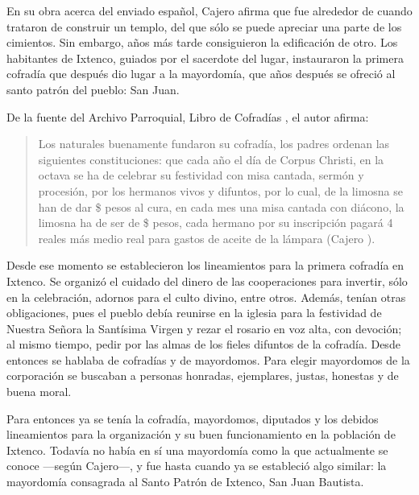\documentclass[14pt,letterpaper,twoside]{extbook} %
\begin{document}
\noindent En su obra acerca del enviado español, Cajero afirma que fue alrededor de  cuando trataron de construir un templo, del que sólo se puede apreciar una parte de los cimientos. Sin embargo, años más tarde consiguieron la edificación de otro. Los habitantes de Ixtenco, guiados por el sacerdote del lugar, instauraron la primera cofradía que después dio lugar a la mayordomía, que años después se ofreció al santo patrón del pueblo: San Juan.

De la fuente del Archivo Parroquial, Libro de Cofradías , el autor afirma:

\begin{quotation}
\noindent Los naturales buenamente fundaron su cofradía, los padres ordenan las siguientes constituciones: que cada año el día de Corpus Christi, en la octava se ha de celebrar su festividad con misa cantada, sermón y procesión, por los hermanos vivos y difuntos, por lo cual, de la limosna se han de dar \$ pesos al cura, en cada mes una misa cantada con diácono, la limosna ha de ser de \$ pesos, cada hermano por su inscripción pagará 4 reales más medio real para gastos de aceite de la lámpara (Cajero ).
\end{quotation}

\noindent Desde ese momento se establecieron los lineamientos para la primera cofradía en Ixtenco. Se organizó el cuidado del dinero de las cooperaciones para invertir, sólo en la celebración, adornos para el culto divino, entre otros. Además, tenían otras obligaciones, pues el pueblo debía reunirse en la iglesia para la festividad de Nuestra Señora la Santísima Virgen y rezar el rosario en voz alta, con devoción; al mismo tiempo, pedir por las almas de los fieles difuntos de la cofradía. Desde entonces se hablaba de cofradías y de mayordomos. Para elegir mayordomos de la corporación se buscaban a personas honradas, ejemplares, justas, honestas y de buena moral.

Para entonces ya se tenía la cofradía, mayordomos, diputados y los debidos lineamientos para la organización y su buen funcionamiento en la población de Ixtenco. Todavía no había en sí una mayordomía como la que actualmente se conoce ---según Cajero---, y fue hasta  cuando ya se estableció algo similar: la mayordomía consagrada al Santo Patrón de Ixtenco, San Juan Bautista.
\end{document}
